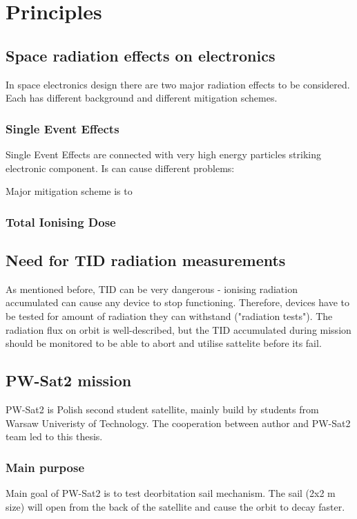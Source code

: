 \chapter{Principles}

\section{Space radiation effects on electronics}
In space electronics design there are two major radiation effects to be considered. Each has different background and different mitigation schemes.

\subsection{Single Event Effects}
Single Event Effects are connected with very high energy particles striking electronic component. Is can cause different problems:


Major mitigation scheme is to 
\subsection{Total Ionising Dose}


\section{Need for TID radiation measurements}
    As mentioned before, TID can be very dangerous - ionising radiation accumulated can cause any device to stop functioning. Therefore, devices have to be tested for amount of radiation they can withstand ("radiation tests"). The radiation flux on orbit is well-described, but the TID accumulated during mission should be monitored to be able to abort and utilise sattelite before its fail. 

\section{PW-Sat2 mission}
    PW-Sat2 is Polish second student satellite, mainly build by students from Warsaw Univeristy of Technology. The cooperation between author and PW-Sat2 team led to this thesis.
    
\subsection{Main purpose}
    Main goal of PW-Sat2 is to test deorbitation sail mechanism. The sail (2x2 m size) will open from the back of the satellite and cause the orbit to decay faster.
    
